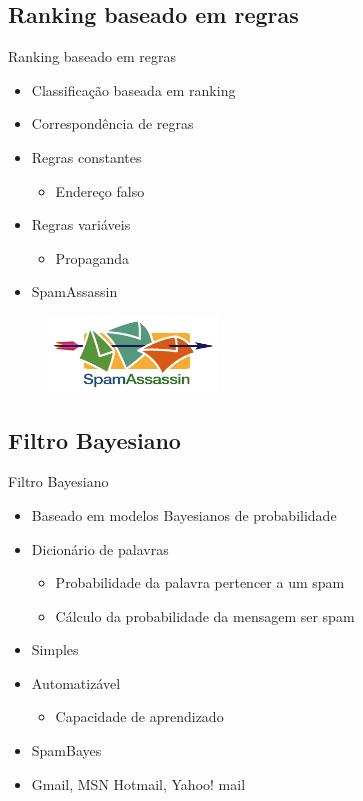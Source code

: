 \documentclass[dvipdfm]{beamer}
\begin{document}
\subsection{Ranking baseado em regras}
\begin{frame}{Ranking baseado em regras}
	\begin{itemize}
		\item Classificação baseada em ranking
		\item Correspondência de regras
		\item Regras constantes
		\begin{itemize}
			\item Endereço falso
		\end{itemize}
		\item Regras variáveis
		\begin{itemize}
			\item Propaganda
		\end{itemize}
		\item SpamAssassin
	\end{itemize}
	\begin{figure}
		\centering
		\includegraphics[height=2cm]{Imagens/random/spamassassin.png}
	\end{figure}
\end{frame}

\subsection{Filtro Bayesiano}
\begin{frame}{Filtro Bayesiano}
	\begin{itemize}
		\item Baseado em modelos Bayesianos de probabilidade
		\item Dicionário de palavras
		\begin{itemize}
			\item Probabilidade da palavra pertencer a um spam
			\item Cálculo da probabilidade da mensagem ser spam
		\end{itemize}
		\item Simples
		\item Automatizável
		\begin{itemize}
			\item Capacidade de aprendizado
		\end{itemize}
		\item SpamBayes
		\item Gmail, MSN Hotmail, Yahoo! mail
	\end{itemize}
\end{frame}
\end{document}

